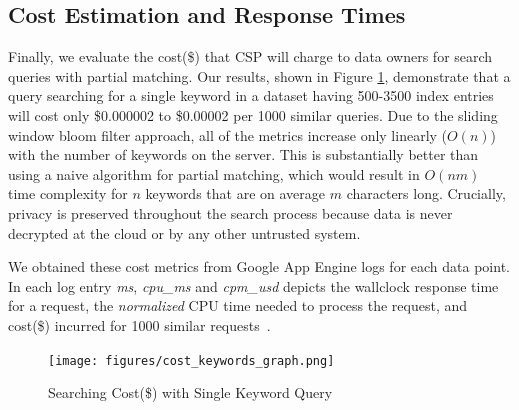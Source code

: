 \subsection{Cost Estimation and Response Times}

Finally, we evaluate the cost(\$) that CSP will charge to data owners for search
queries with partial matching. 
Our results, shown in Figure \ref{fig:cost_single_query}, demonstrate that a query
searching for a single keyword in a dataset having 500-3500 index entries will cost only \$0.000002 to \$0.00002 per 1000 similar
queries. Due to the sliding window bloom filter approach, 
all of the metrics increase only linearly ($O(n)$) with the number
of keywords on the server. This is substantially better than using a naive algorithm 
for partial matching, which would result in $O(nm)$ time complexity 
for $n$ keywords that are on average $m$ characters long. Crucially,
privacy is preserved throughout the search process because data is never
decrypted at the cloud or by any other untrusted system.

We obtained these cost metrics from Google App Engine logs for each data point. In
each log entry \emph{ms}, \emph{cpu\_ms} and \emph{cpm\_usd} depicts the wallclock response
time for a request, the \emph{normalized} CPU time needed to process the
request, and cost(\$) incurred for 1000 similar requests~\cite{google_cloud_logs}.


\begin{figure}
  \centering
  \texttt{[image: figures/cost\_keywords\_graph.png]}
  \caption{Searching Cost(\$) with Single Keyword Query}
  \label{fig:cost_single_query}
\end{figure}
